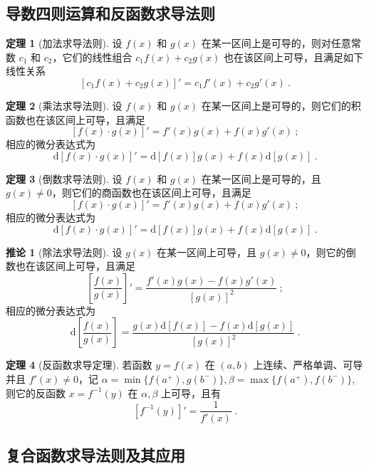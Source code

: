 \documentclass[zihao=-4,linespread=1.8,UTF8,nothm]{aytony_base}
\theoremstyle{definition}
\newtheorem{theorem}{\indent\heiti\textbf{定理}}[subsection]
\newtheorem*{corollary}{\indent\heiti\textbf{推论}}
\begin{document}
\subsection{导数四则运算和反函数求导法则}

\begin{theorem}[加法求导法则]
    设 $f(x)$ 和 $g(x)$ 在某一区间上是可导的，则对任意常数 $c_1$ 和 $c_2$，它们的线性组合 $c_1f(x) + c_2g(x)$ 也在该区间上可导，且满足如下线性关系 $$
        [c_1f(x) + c_2g(x)]' = c_1f'(x) + c_2g'(x)\ .
    $$
\end{theorem}

\begin{theorem}[乘法求导法则]
    设 $f(x)$ 和 $g(x)$ 在某一区间上是可导的，则它们的积函数也在该区间上可导，且满足 $$
        [f(x) \cdot g(x)]' = f'(x)g(x) + f(x)g'(x)\ ;
    $$ 相应的微分表达式为 $$
        \mathrm{d}[f(x) \cdot g(x)]' = \mathrm{d}[f(x)]g(x) + f(x)\mathrm{d}[g(x)]\ .
    $$
\end{theorem}

\begin{theorem}[倒数求导法则]
    设 $f(x)$ 和 $g(x)$ 在某一区间上是可导的，且 $g(x) \neq 0$，则它们的商函数也在该区间上可导，且满足 $$
        [f(x) \cdot g(x)]' = f'(x)g(x) + f(x)g'(x)\ ;
    $$ 相应的微分表达式为 $$
        \mathrm{d}[f(x) \cdot g(x)]' = \mathrm{d}[f(x)]g(x) + f(x)\mathrm{d}[g(x)]\ .
    $$
\end{theorem}

\begin{corollary}[除法求导法则]
    设 $g(x)$ 在某一区间上可导，且 $g(x) \neq 0$，则它的倒数也在该区间上可导，且满足 $$
        \left[\dfrac{f(x)}{g(x)}\right]' = \dfrac{f'(x)g(x) - f(x)g'(x)}{[g(x)]^2}\ ;
    $$ 相应的微分表达式为 $$
        \mathrm{d}\left[\dfrac{f(x)}{g(x)}\right] = \dfrac{g(x)\mathrm{d}[f(x)] - f(x)\mathrm{d}[g(x)]}{[g(x)]^2}\ .
    $$
\end{corollary}

\begin{theorem}[反函数求导定理]
    若函数 $y = f(x)$ 在 $(a, b)$ 上连续、严格单调、可导并且 $f'(x) \neq 0$，记 $\alpha = \min\{f(a^+), g(b^-)\}, \beta = \max\{f(a^+), f(b^-)\}$, 则它的反函数 $x = f^{-1}(y)$ 在 $\alpha, \beta$ 上可导，且有 $$
        [f^{-1}(y)]' = \dfrac{1}{f'(x)}\ .
    $$
\end{theorem}

\subsection{复合函数求导法则及其应用}
\end{document}
